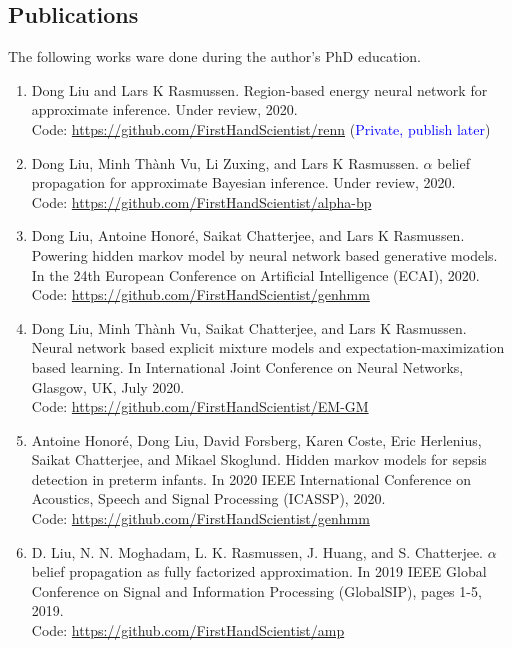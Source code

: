 \subsection{Publications}
The following works ware done during the author's PhD education.
\begin{enumerate}
\item Dong Liu and Lars K Rasmussen. Region-based energy neural network for approximate inference. Under review, 2020. \\
  Code: \href{https://github.com/FirstHandScientist/renn}{https://github.com/FirstHandScientist/renn} (\textcolor{blue}{Private, publish later})
\item Dong Liu, Minh Th\`{a}nh Vu, Li Zuxing, and Lars K Rasmussen. $\alpha$ belief propagation for approximate Bayesian inference. Under review, 2020.\\
  Code: \href{https://github.com/FirstHandScientist/alpha-bp}{https://github.com/FirstHandScientist/alpha-bp}

\item Dong Liu, Antoine Honor{\'e}, Saikat Chatterjee, and Lars K Rasmussen. Powering hidden
  markov model by neural network based generative models. In the 24th European Conference on Artificial Intelligence (ECAI), 2020.\\
  Code: \href{https://github.com/FirstHandScientist/genhmm}{https://github.com/FirstHandScientist/genhmm}

\item Dong Liu, Minh Th\`{a}nh Vu, Saikat Chatterjee, and Lars K Rasmussen. Neural network based explicit mixture models and expectation-maximization based learning. In International Joint Conference on Neural Networks, Glasgow, UK, July 2020. \\
  Code: \href{https://github.com/FirstHandScientist/EM-GM}{https://github.com/FirstHandScientist/EM-GM}

\item Antoine Honor{\'e}, Dong Liu, David Forsberg, Karen Coste, Eric Herlenius, Saikat Chatterjee, and Mikael Skoglund. Hidden markov models for sepsis detection in preterm infants. In 2020 IEEE International Conference on Acoustics, Speech and Signal Processing (ICASSP), 2020.\\
  Code: \href{https://github.com/FirstHandScientist/genhmm}{https://github.com/FirstHandScientist/genhmm}

\item D. Liu, N. N. Moghadam, L. K. Rasmussen, J. Huang, and S. Chatterjee. $\alpha$ belief propagation as fully factorized approximation. In 2019 IEEE Global Conference on Signal and Information Processing (GlobalSIP), pages 1-5, 2019.\\
  Code: \href{https://github.com/FirstHandScientist/amp}{https://github.com/FirstHandScientist/amp}


\end{enumerate}
